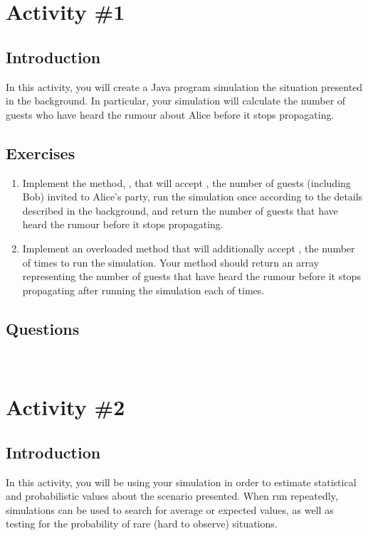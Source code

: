 	\pagebreak

	\section{Activity \#1}
		\subsection{Introduction}
			In this activity, you will create a Java program simulation the situation presented in the background. In particular, your simulation will calculate the number of guests who have heard the rumour about Alice before it stops propagating.

		\subsection{Exercises}
			\begin{enumerate}
				\item Implement the method, , that will accept , the number of guests (including Bob) invited to Alice's party, run the simulation once according to the details described in the background, and return the number of guests that have heard the rumour before it stops propagating.
				\item Implement an overloaded  method that will additionally accept , the number of times to run the simulation. Your method should return an array representing the number of guests that have heard the rumour before it stops propagating after running the simulation each of  times.
			\end{enumerate}

		\subsection{Questions}
			\ \\[9pt]

	\pagebreak

	\section{Activity \#2}
		\subsection{Introduction}
			In this activity, you will be using your simulation in order to estimate statistical and probabilistic values about the scenario presented. When run repeatedly, simulations can be used to search for average or expected values, as well as testing for the probability of rare (hard to observe) situations.


